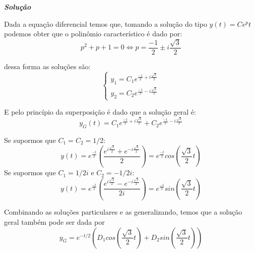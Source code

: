 \linespread{1.5}

\textit{\textbf{Solução}}

Dada a equação diferencial temos que, tomando a solução do tipo $ y(t) = Ce^pt $ podemos obter que o polinômio característico é dado por:
\begin{equation*}
    p^2 + p + 1 = 0 \Longleftrightarrow p = \frac{-1}{2}\pm i\frac{\sqrt{3}}{2}
\end{equation*}

dessa forma as soluções são:
\begin{equation*}
    \begin{cases}
    y_1 = C_1e^{\frac{-1}{2} + i\frac{\sqrt{3}}{2}}\\
    y_2 = C_2e^{\frac{-1}{2} - i\frac{\sqrt{3}}{2}}
    \end{cases}
\end{equation*}

E pelo princípio da superposição é dado que a solução geral é:
\begin{equation*}
    y_G(t) = C_1e^{\frac{-1}{2} + i\frac{\sqrt{3}}{2}} + C_2e^{\frac{-1}{2} - i\frac{\sqrt{3}}{2}}
\end{equation*}

Se supormos que $C_1 = C_2 = 1/2$:
\begin{equation*}
    y(t) = e^{\frac{-t}{2}}\left(\frac{e^{i\frac{\sqrt{3}}{2}} + e^{-i\frac{\sqrt{3}}{2}}}{2}\right) = e^{\frac{-t}{2}}cos\left(\frac{\sqrt{3}}{2}t\right)
\end{equation*}
Se supormos que $C_1 = 1/2i$ e $C_2 = -1/2i$:
\begin{equation*}
    y(t) = e^{\frac{-t}{2}}\left(\frac{e^{i\frac{\sqrt{3}}{2}} - e^{-i\frac{\sqrt{3}}{2}}}{2i}\right) = e^{\frac{-t}{2}}sin\left(\frac{\sqrt{3}}{2}t\right)
\end{equation*}

Combinando as soluções particulares e as generalizando, temos que a solução geral também pode ser dada por 
\begin{equation*}
    y_G = e^{-t/2}\left(D_1cos\left(\frac{\sqrt{3}}{2}t\right) + D_2sin\left(\frac{\sqrt{3}}{2}t\right)\right)
\end{equation*}